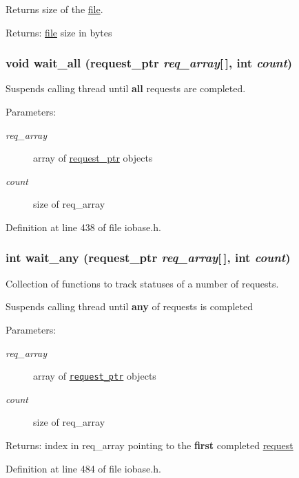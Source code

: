 Returns size of the \hyperlink{classfile}{file}. 

\begin{Desc}
\item[Returns:]\hyperlink{classfile}{file} size in bytes \end{Desc}
\hypertarget{group__iolayer_g06afc14fe71f0a16bb7c4e607c546a2d}{
\subsubsection[{wait\_\-all}]{\setlength{\rightskip}{0pt plus 5cm}void wait\_\-all ({\bf request\_\-ptr} {\em req\_\-array}\mbox{[}$\,$\mbox{]}, \/  int {\em count})}}
\label{group__iolayer_g06afc14fe71f0a16bb7c4e607c546a2d}


Suspends calling thread until {\bf all} requests are completed. 

\begin{Desc}
\item[Parameters:]
\begin{description}
\item[{\em req\_\-array}]array of \hyperlink{classrequest__ptr}{request\_\-ptr} objects \item[{\em count}]size of req\_\-array \end{description}
\end{Desc}


Definition at line 438 of file iobase.h.\hypertarget{group__iolayer_g7a455713cd840b099075368af3f30ff5}{
\subsubsection[{wait\_\-any}]{\setlength{\rightskip}{0pt plus 5cm}int wait\_\-any ({\bf request\_\-ptr} {\em req\_\-array}\mbox{[}$\,$\mbox{]}, \/  int {\em count})}}
\label{group__iolayer_g7a455713cd840b099075368af3f30ff5}


Collection of functions to track statuses of a number of requests. 

Suspends calling thread until {\bf any} of requests is completed \begin{Desc}
\item[Parameters:]
\begin{description}
\item[{\em req\_\-array}]array of {\tt \hyperlink{classrequest__ptr}{request\_\-ptr}} objects \item[{\em count}]size of req\_\-array \end{description}
\end{Desc}
\begin{Desc}
\item[Returns:]index in req\_\-array pointing to the {\bf first} completed \hyperlink{classrequest}{request} \end{Desc}


Definition at line 484 of file iobase.h.